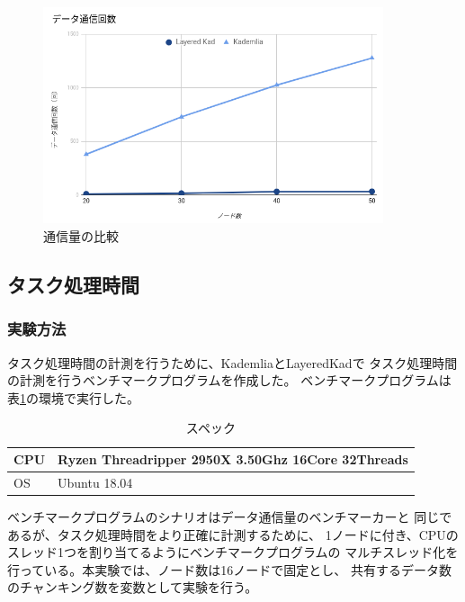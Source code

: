 \documentclass[sotsuron]{jcsie}
\begin{document}
\begin{figure}[H]
	\centering
	\includegraphics[width=10cm]{./assets/image/traffic_graph.png}
	\caption{通信量の比較}
	\label{fig:traffic-graph}
\end{figure}

\subsection{タスク処理時間}
\subsubsection{実験方法}
タスク処理時間の計測を行うために、KademliaとLayeredKadで
タスク処理時間の計測を行うベンチマークプログラムを作成した。
ベンチマークプログラムは表\ref{table:spec-ryzen}の環境で実行した。

\begin{table}[H]
	\caption{スペック}	
	\centering
	\label{table:spec-ryzen}
	\begin{tabular}{|l|l|}
		\hline
		CPU &   
		Ryzen Threadripper 2950X 3.50Ghz 16Core 32Threads \\ 
		\hline	
		OS  &   
		Ubuntu 18.04 \\ 
		\hline
	\end{tabular}	
\end{table}

ベンチマークプログラムのシナリオはデータ通信量のベンチマーカーと
同じであるが、タスク処理時間をより正確に計測するために、
1ノードに付き、CPUのスレッド1つを割り当てるようにベンチマークプログラムの
マルチスレッド化を行っている。本実験では、ノード数は16ノードで固定とし、
共有するデータ数のチャンキング数を変数として実験を行う。
\end{document}
